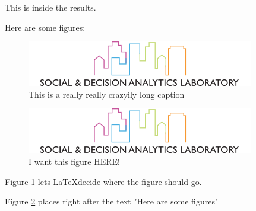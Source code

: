 \documentclass[../master.tex]{subfiles}
\begin{document}
This is inside the results.

Here are some figures:

\begin{figure}
\centering
\includegraphics[width=0.7\linewidth]{sdal-logo}
\caption[Short caption]{This is a really really crazyily long caption}
\label{fig:sdal-logo1}
\end{figure}

\begin{figure}[h!]
\centering
\includegraphics[width=0.7\linewidth]{sdal-logo}
\caption[HERE!]{I want this figure HERE!}
\label{fig:sdal-logo2}
\end{figure}

Figure \ref{fig:sdal-logo1} lets \LaTeX decide where the figure should go.

Figure \ref{fig:sdal-logo2} places right after the text "Here are some figures"
\end{document}
